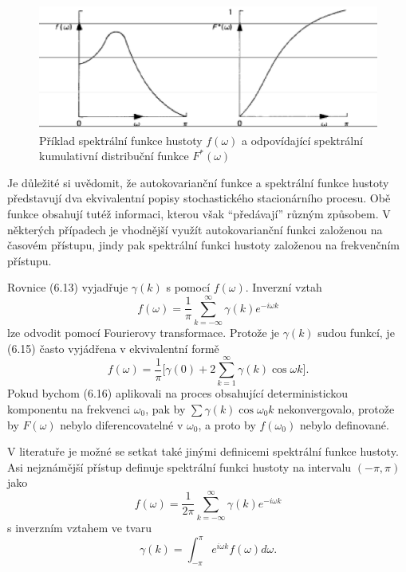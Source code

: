 \begin{figure}[htp]
\centering
\includegraphics[scale = 0.75]{pictures/figure_6_2.eps}
\caption{Příklad spektrální funkce hustoty $f(\omega)$ a odpovídající spektrální kumulativní distribuční funkce $F^*(\omega)$}
\label{figure_6_2}
\end{figure}

Je důležité si uvědomit, že autokovarianční funkce a spektrální funkce hustoty představují dva ekvivalentní popisy stochastického stacionárního procesu. Obě funkce obsahují tutéž informaci, kterou však ``předávají'' různým způsobem. V některých případech je vhodnější využít autokovarianční funkci založenou na časovém přístupu, jindy pak spektrální funkci hustoty založenou na frekvenčním přístupu.

Rovnice (6.13) vyjadřuje $\gamma(k)$ s pomocí $f(\omega)$. Inverzní vztah
\begin{equation}
f(\omega) = \frac{1}{\pi} \sum_{k = -\infty}^{\infty} \gamma(k)e^{-i \omega k}
\end{equation}
lze odvodit pomocí Fourierovy transformace. Protože je $\gamma(k)$ sudou funkcí, je (6.15) často vyjádřena v ekvivalentní formě
\begin{equation}
f(\omega) = \frac{1}{\pi}\Big[\gamma(0) + 2 \sum_{k = 1}^{\infty} \gamma(k) \cos \omega k \Big].
\end{equation}
Pokud bychom (6.16) aplikovali na proces obsahující deterministickou komponentu na frekvenci $\omega_0$, pak by $\sum \gamma(k) \cos \omega_0 k$ nekonvergovalo, protože by $F(\omega)$ nebylo diferencovatelné v $\omega_0$, a proto by $f(\omega_0)$ nebylo definované.

V literatuře je možné se setkat také jinými definicemi spektrální funkce hustoty. Asi nejznámější přístup definuje spektrální funkci hustoty na intervalu $(-\pi, \pi)$ jako
\begin{equation}
f(\omega) = \frac{1}{2 \pi} \sum_{k = -\infty}^{\infty} \gamma(k) e^{-i \omega k}
\end{equation}
s inverzním vztahem ve tvaru
\begin{equation}
\gamma(k) = \int_{-\pi}^{\pi} e^{i \omega k} f(\omega) d \omega.
\end{equation}

